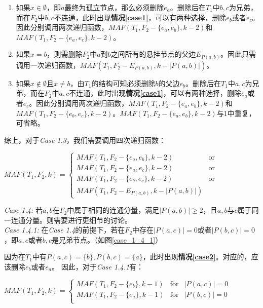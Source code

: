 \begin{enumerate}
	\item 如果$x \in \emptyset$，即$a$最终为孤立节点，那么必须删除$e_a$。删除后在$T_1$中$b,c$为兄弟，而在$F_2$中$b,c$不连通，此时出现\textbf{情况\ref{case1}}，可以有两种选择，删除$e_b$或者$e_c$。因此分别调用两次递归函数，$MAF(T_1,F_2-\{e_a,e_b\},k-2)$和$MAF(T_1,F_2-\{e_a,e_c\},k-2)$。
	\item 如果$x = b$，则需删除$F_2$中$a$到$b$之间所有的悬挂节点的父边$E_{P(a,b)}$。因此只需调用一次递归函数，$MAF(T_1,F_2-E_{P(a,b)},k-|P(a,b)|)$。
	\item 如果$x \notin \emptyset$且$x \neq b$，由$T_1$的结构可知必须删除$b$的父边$e_b$。删除后在$T_1$中$a,c$为兄弟，而在$F_2$中$a,c$不连通，此时出现\textbf{情况\ref{case1}}，可以有两种选择，删除$e_a$或者$e_c$。因此分别调用两次递归函数，$MAF(T_1,F_2-\{e_a,e_b\},k-2)$和$MAF(T_1,F_2-\{e_b,e_c\},k-2)$。$MAF(T_1,F_2-\{e_a,e_b\},k-2)$与1中重复，可省略。\\
\end{enumerate}
综上，对于\textit{Case 1.3}，我们需要调用四次递归函数：
\begin{center}
$MAF(T_1,F_2,k) = \left\{
\begin{array}{lr}
         MAF(T_1,F_2-\{e_a,e_b\},k-2) & \mbox{or}\\ 
         MAF(T_1,F_2-\{e_a,e_c\},k-2) & \mbox{or}\\
         MAF(T_1,F_2-\{e_b,e_c\},k-2) & \mbox{or}\\
         MAF(T_1,F_2-E_{P(a,b)},k-|P(a,b)|) & 
\end{array}
\right.$
\end{center}

\textit{Case 1.4: }若$a,b$在$F_2$中属于相同的连通分量，满足$|P(a,b)| \ge 2$，且$a,b$与$c$属于同一连通分量。则需要进行更细节的讨论。
$ $\\

\textit{Case 1.4.1: }在\textit{Case 1.4}的前提下，若在$F_2$中存在$|P(a,c)|=0$或者$|P(b,c)|=0$，即$a,c$或者$b,c$是兄弟节点。（如图\ref{case_1_4_1}）

因为在$T_1$中有$P(a,c)=\{b\},P(b,c)=\{a\}$，此时出现\textbf{情况\ref{case2}}。对应的，应该删除$e_b$或者$e_a$。
因此，对于\textit{Case 1.4.1}有：
\begin{center}
$MAF(T_1,F_2,k) = \left\{
\begin{array}{lcl}
         MAF(T_1,F_2-\{e_b\},k-1) & \mbox{for} & |P(a,c)|=0\\ 
         MAF(T_1,F_2-\{e_a\},k-1) & \mbox{for} & |P(b,c)|=0\\
\end{array}
\right.$
\end{center}
$  $\\

